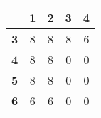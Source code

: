\begin{tabular}{ | c | c | c | c | c | }
\hline
 & {\bf1} & {\bf2} & {\bf3} & {\bf4} \\ \hline
{\bf 3} & 8 & 8 & 8 & 6 \\ \hline
{\bf 4} & 8 & 8 & 0 & 0 \\ \hline
{\bf 5} & 8 & 8 & 0 & 0 \\ \hline
{\bf 6} & 6 & 6 & 0 & 0 \\ \hline
\end{tabular}